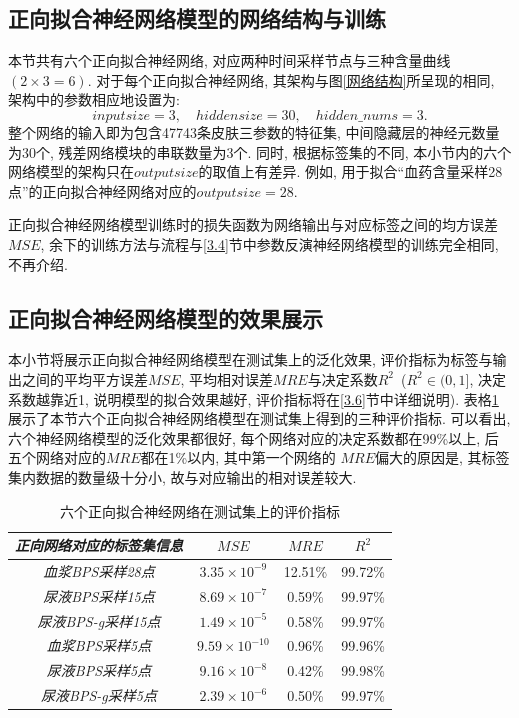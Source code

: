 \documentclass[a4paper,punct=banjiao,twoside]{ctexrep}
\theoremstyle{plain}
\theoremstyle{definition}
\theoremstyle{remark}
\begin{document}
\subsection*{正向拟合神经网络模型的网络结构与训练}

本节共有六个正向拟合神经网络, 对应两种时间采样节点与三种含量曲线$(2\times 3 = 6)$. 对于每个正向拟合神经网络, 其架构与图\ref{网络结构}所呈现的相同, 架构中的参数相应地设置为:
$$
inputsize = 3, \quad hiddensize = 30, \quad hidden\_nums = 3.
$$
\noindent 整个网络的输入即为包含47743条皮肤三参数的特征集, 中间隐藏层的神经元数量为30个, 残差网络模块的串联数量为3个. 同时, 根据标签集的不同, 本小节内的六个网络模型的架构只在$outputsize$的取值上有差异. 例如, 用于拟合``血药含量采样28点''的正向拟合神经网络对应的$outputsize=28$.

正向拟合神经网络模型训练时的损失函数为网络输出与对应标签之间的均方误差$MSE$, 余下的训练方法与流程与\ref{3.4}节中参数反演神经网络模型的训练完全相同, 不再介绍.

\subsection*{正向拟合神经网络模型的效果展示}
本小节将展示正向拟合神经网络模型在测试集上的泛化效果, 评价指标为标签与输出之间的平均平方误差$MSE$, 平均相对误差$MRE$与决定系数$R^2$ $\,$($R^2 \in (0,1]$, 决定系数越靠近1, 说明模型的拟合效果越好, 评价指标将在\ref{3.6}节中详细说明).
表格\ref{tab4.0}展示了本节六个正向拟合神经网络模型在测试集上得到的三种评价指标. 可以看出, 六个神经网络模型的泛化效果都很好, 每个网络对应的决定系数都在99\%以上, 后五个网络对应的$MRE$都在1\%以内, 其中第一个网络的
$MRE$偏大的原因是, 其标签集内数据的数量级十分小, 故与对应输出的相对误差较大.
\begin{table}[htbp]
  \centering
  \begin{tabular}[t]{c*{3}{c}}
    \hline
    \textit{正向网络对应的标签集信息} &$MSE$ & $MRE$ & $R^2$\\
    \hline
    \textit{血浆BPS采样28点} & $3.35\times 10^{-9}$     &  12.51\%     &  99.72\%  \\ 
    \textit{尿液BPS采样15点} &  $8.69\times 10^{-7}$     &  0.59\%     & 99.97\%  \\ 
    \textit{尿液BPS-g采样15点} &  $1.49\times 10^{-5}$     &  0.58\%     & 99.97\%  \\ 

    \textit{血浆BPS采样5点} & $9.59\times 10^{-10}$     &  0.96\%     &  99.96\%  \\ 
    \textit{尿液BPS采样5点} &  $9.16\times 10^{-8}$     &  0.42\%     & 99.98\%  \\ 
    \textit{尿液BPS-g采样5点} &  $2.39\times 10^{-6}$     &  0.50\%     & 99.97\%  \\ 
    \hline
  \end{tabular}
  \caption{\label{tab4.0}六个正向拟合神经网络在测试集上的评价指标} 
\end{table}
\end{document}
